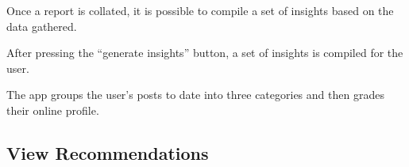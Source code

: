\begin{figure}
\begin{minipage}{4.6cm}
    \caption{}
    \label{fig:ui_insight_step3}
  \end{minipage}
\end{figure}

\begin{minipage}{\textwidth}
  \centering
  \begin{minipage}[t]{4.6cm}
    \vspace{0pt}
    \centering
    \begin{minipage}{4.4cm}
      Once a report is collated, it is possible to compile a set of insights based on the data gathered.
    \end{minipage}
  \end{minipage}
  \begin{minipage}[t]{4.6cm}
    \vspace{0pt}
    \centering
    \begin{minipage}{4.4cm}
      After pressing the ``generate insights'' button, a set of insights is compiled for the user.
    \end{minipage}
  \end{minipage}
  \begin{minipage}[t]{4.6cm}
    \vspace{0pt}
    \centering
    \begin{minipage}{4.4cm}
      The app groups the user’s posts to date into three categories and then grades their online profile.
    \end{minipage}
  \end{minipage}
\end{minipage}

\clearpage

\subsection{View Recommendations}

